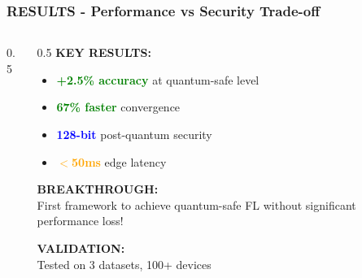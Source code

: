 \documentclass[aspectratio=169]{beamer}
\begin{document}
\begin{frame}
    \frametitle{RESULTS - Performance vs Security Trade-off}
    \begin{columns}
        \begin{column}{0.5\textwidth}
        \end{column}
        \begin{column}{0.5\textwidth}
            \textbf{KEY RESULTS:}
            \begin{itemize}
                \item \textcolor{green}{\textbf{+2.5\% accuracy}} at quantum-safe level
                \item \textcolor{green}{\textbf{67\% faster}} convergence
                \item \textcolor{blue}{\textbf{128-bit}} post-quantum security
                \item \textcolor{orange}{\textbf{$<$50ms}} edge latency
            \end{itemize}
            
            \textbf{BREAKTHROUGH:}
            \\ First framework to achieve quantum-safe FL without significant performance loss!
            
            \textbf{VALIDATION:}
            \\ Tested on 3 datasets, 100+ devices
        \end{column}
    \end{columns}
\end{frame}
\end{document}

